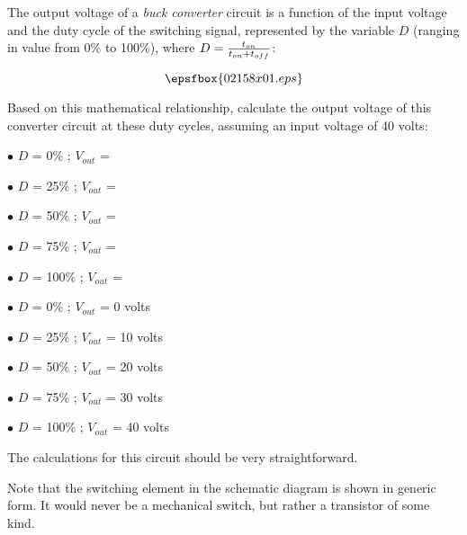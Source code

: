 

The output voltage of a {\it buck converter} circuit is a function of the input voltage and the duty cycle of the switching signal, represented by the variable $D$ (ranging in value from 0\% to 100\%), where $D = {{t_{on}} \over {t_{on} + t_{off}}}$:


$$\epsfbox{02158x01.eps}$$

Based on this mathematical relationship, calculate the output voltage of this converter circuit at these duty cycles, assuming an input voltage of 40 volts:

\medskip
\goodbreak
\item{$\bullet$} $D$ = 0\% ; $V_{out}$ = 
\item{$\bullet$} $D$ = 25\% ; $V_{out}$ =
\item{$\bullet$} $D$ = 50\% ; $V_{out}$ =
\item{$\bullet$} $D$ = 75\% ; $V_{out}$ =
\item{$\bullet$} $D$ = 100\% ; $V_{out}$ =
\medskip







\medskip
\goodbreak
\item{$\bullet$} $D$ = 0\% ; $V_{out}$ = 0 volts
\item{$\bullet$} $D$ = 25\% ; $V_{out}$ = 10 volts
\item{$\bullet$} $D$ = 50\% ; $V_{out}$ = 20 volts
\item{$\bullet$} $D$ = 75\% ; $V_{out}$ = 30 volts
\item{$\bullet$} $D$ = 100\% ; $V_{out}$ = 40 volts
\medskip







The calculations for this circuit should be very straightforward.  

Note that the switching element in the schematic diagram is shown in generic form.  It would never be a mechanical switch, but rather a transistor of some kind.




